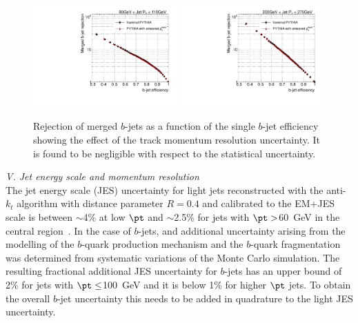 \begin{figure}[tp]
\centering
\includegraphics[width=0.49\textwidth]{FIGS/systematics/LlhoodKDE_ISO_TrackMomentumResolution_FIX2Test_rejvseff080.pdf}
\includegraphics[width=0.49\textwidth]{FIGS/systematics/LlhoodKDE_ISO_TrackMomentumResolution_FIX2Test_rejvseff200.pdf}
\caption{Rejection of merged $b$-jets as a function of the single $b$-jet efficiency showing the effect of the track momentum resolution uncertainty. It is found to be negligible with respect to the statistical uncertainty. }
\label{fig:trackmomentum}
\end{figure}


\vspace{3mm}
{ \em V. Jet energy scale and momentum resolution}
\\[3mm]
The jet energy scale (JES) uncertainty for light jets reconstructed with the anti-$k_t$ algorithm with distance parameter $R=0.4$ and calibrated to the  EM+JES scale is between $\sim$4\% at low $\pt$ and $\sim$2.5\% for jets with  $\pt > $60~GeV in the central region~\cite{JESUncertainty}. In the case of $b$-jets, and additional uncertainty arising from the modelling of the $b$-quark production mechanism and the $b$-quark fragmentation was determined from systematic variations of the Monte Carlo simulation. %
The resulting fractional additional JES uncertainty for $b$-jets has an upper bound of 2\% for jets with $\pt \leq$100~GeV and it is below 1\% for higher $\pt$ jets. To obtain the overall $b$-jet uncertainty this needs to be added in quadrature to the light JES uncertainty. 

